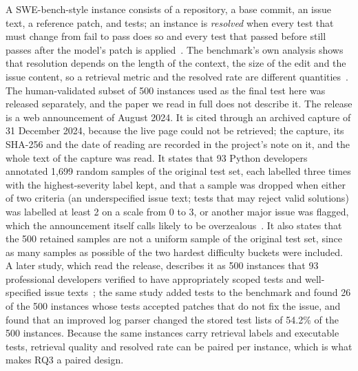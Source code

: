 \documentclass[10pt,twocolumn]{article}
\makeatletter
\renewcommand\paragraph{\@startsection{paragraph}{4}{\z@}{3pt}{-0.5em}{\normalfont\bfseries}}
\makeatother
\begin{document}
\paragraph{Resolved rate.} A SWE-bench-style instance consists of a repository, a base commit, an
issue text, a reference patch, and tests; an instance is \emph{resolved} when every test that must
change from fail to pass does so and every test that passed before still passes after the model's
patch is applied~\cite{swebench}. The benchmark's own analysis shows that resolution depends on the
length of the context, the size of the edit and the issue content, so a retrieval metric and the
resolved rate are different quantities~\cite{swebench}. The human-validated subset of 500 instances
used as the final test here was released separately, and the paper we read in full does not describe
it. %
The release is a web announcement of August 2024. It is cited through an archived capture of 31 December 2024, because the live page could not be
retrieved; the capture, its SHA-256 and the date of reading are recorded in the project's note on it, and the whole text of the capture was read.
It states that 93 Python developers annotated 1,699 random samples of the original test set, each labelled three times with the highest-severity label kept,
and that a sample was dropped when either of two criteria (an underspecified issue text; tests that may reject valid solutions) was labelled at least 2 on a scale from 0 to 3, or another
major issue was flagged, which the announcement itself calls likely to be overzealous~\cite{verifiedannouncement}. %
It also states that the 500 retained samples are not a uniform sample of the original test set, since as many samples as possible of the two hardest difficulty buckets were included. %
A later study, which read the release, describes it as 500 instances that 93 professional developers verified to have
appropriately scoped tests and well-specified issue texts~\cite{utboost}; %
the same study added tests to the benchmark and found 26 of the 500 instances whose tests accepted patches that do not fix the issue, and found
that an improved log parser changed the stored test lists of 54.2\% of the 500 instances. %
Because the same instances carry retrieval labels and executable tests, retrieval quality and
resolved rate can be paired per instance, which is what makes RQ3 a paired design.
\end{document}

